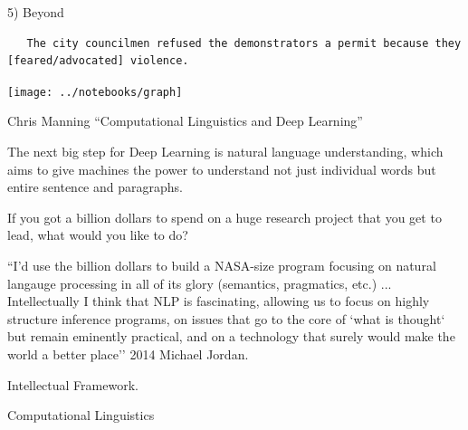 \documentclass{beamer}
\begin{document}
\begin{frame}{5) Beyond}
\begin{verbatim}
   The city councilmen refused the demonstrators a permit because they [feared/advocated] violence.
\end{verbatim}
\end{frame}

\begin{frame}
  \vspace{-5cm}
  
  \hspace*{-2cm}
  \texttt{[image: ../notebooks/graph]}
\end{frame}

\begin{frame}
  

  
\end{frame}

\begin{frame}
  Chris Manning ``Computational Linguistics and Deep Learning''
\end{frame}

\begin{frame}
  The next big step for Deep Learning is natural language understanding, which aims to give machines the power to understand not just individual words but entire sentence and paragraphs. 
\end{frame}

\begin{frame}
  If you got a billion dollars to spend on a huge research project that you get to lead, what would you like to do? 
  
  ``I'd use the billion dollars to build a NASA-size program focusing on natural langauge processing in all of its glory (semantics, pragmatics, etc.) ... Intellectually I think that NLP is fascinating, allowing us to focus on highly structure inference programs, on issues that go to the core of `what is thought` but remain eminently practical, and on a technology that surely would make the world a better place'' 
  2014 Michael Jordan. 
\end{frame}

\begin{frame}{Intellectual Framework.}
  
\end{frame}

\begin{frame}{Computational Linguistics}
  
\end{frame}
\end{document}
